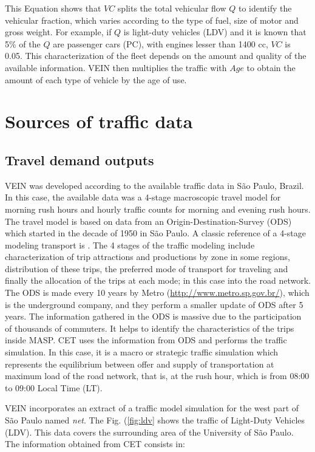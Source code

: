 \documentclass[12pt,graybox,envcountchap,sectrefs]{krantz}
\theoremstyle{definition}
\theoremstyle{definition}
\theoremstyle{definition}
\theoremstyle{remark}
\begin{document}
This Equation shows that \(VC\) splits the total vehicular flow \(Q\) to
identify the vehicular fraction, which varies according to the type of
fuel, size of motor and gross weight. For example, if \(Q\) is
light-duty vehicles (LDV) and it is known that 5\% of the \(Q\) are
passenger cars (PC), with engines lesser than 1400 cc, \(VC\) is 0.05.
This characterization of the fleet depends on the amount and quality of
the available information. VEIN then multiplies the traffic with \(Age\)
to obtain the amount of each type of vehicle by the age of use.

\section{Sources of traffic data}\label{sources-of-traffic-data}

\subsection{Travel demand outputs}\label{travel-demand-outputs}

VEIN was developed according to the available traffic data in São Paulo,
Brazil. In this case, the available data was a 4-stage macroscopic
travel model for morning rush hours and hourly traffic counts for
morning and evening rush hours. The travel model is based on data from
an Origin-Destination-Survey (ODS) \citep{ODS} which started in the
decade of 1950 in São Paulo. A classic reference of a 4-stage modeling
transport is \citep{OrtuzarWillumsen2002}. The 4 stages of the traffic
modeling include characterization of trip attractions and productions by
zone in some regions, distribution of these trips, the preferred mode of
transport for traveling and finally the allocation of the trips at each
mode; in this case into the road network. The ODS is made every 10 years
by Metro (\url{http://www.metro.sp.gov.br/}), which is the underground
company, and they perform a smaller update of ODS after 5 years. The
information gathered in the ODS is massive due to the participation of
thousands of commuters. It helps to identify the characteristics of the
trips inside MASP. CET uses the information from ODS and performs the
traffic simulation. In this case, it is a macro or strategic traffic
simulation which represents the equilibrium between offer and supply of
transportation at maximum load of the road network, that is, at the rush
hour, which is from 08:00 to 09:00 Local Time (LT).

VEIN incorporates an extract of a traffic model simulation for the west
part of São Paulo named \emph{net}. The Fig. (\ref{fig:ldv} shows the
traffic of Light-Duty Vehicles (LDV). This data covers the surrounding
area of the University of São Paulo. The information obtained from CET
consists in:
\end{document}
